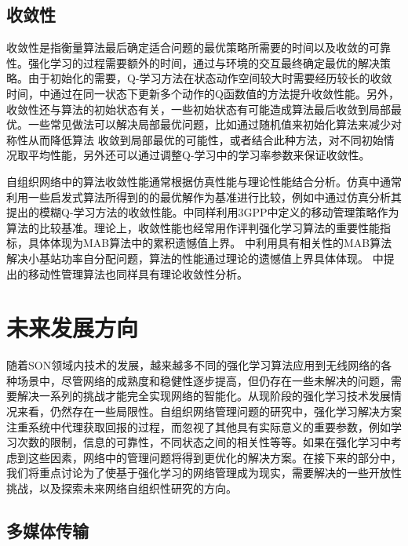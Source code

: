 \documentclass{IEEEtran}
\begin{document}
\subsection{收敛性}
收敛性是指衡量算法最后确定适合问题的最优策略所需要的时间以及收敛的可靠性。强化学习的过程需要额外的时间，通过与环境的交互最终确定最优的解决策略。由于初始化的需要，Q-学习方法在状态动作空间较大时需要经历较长的收敛时间，\cite{Simsek2011}中通过在同一状态下更新多个动作的Q函数值的方法提升收敛性能。另外，收敛性还与算法的初始状态有关，一些初始状态有可能造成算法最后收敛到局部最优。一些常见做法可以解决局部最优问题，比如通过随机值来初始化算法来减少对称性从而降低算法 收敛到局部最优的可能性，或者结合此种方法，对不同初始情况取平均性能，另外还可以通过调整Q-学习中的学习率参数来保证收敛性。

自组织网络中的算法收敛性能通常根据仿真性能与理论性能结合分析。仿真中通常利用一些启发式算法所得到的的最优解作为基准进行比较，例如\cite{Razavi2010a}中通过仿真分析其提出的模糊Q-学习方法的收敛性能。\cite{Simsek2015a}中同样利用3GPP中定义的移动管理策略作为算法的比较基准。理论上，收敛性能也经常用作评判强化学习算法的重要性能指标，具体体现为MAB算法中的累积遗憾值上界。\cite{Wang2017} 中利用具有相关性的MAB算法解决小基站功率自分配问题，算法的性能通过理论的遗憾值上界具体体现。\cite{Shen2016} 中提出的移动性管理算法也同样具有理论收敛性分析。

\section{未来发展方向}
\label{sec:FutureWork}


随着SON领域内技术的发展，越来越多不同的强化学习算法应用到无线网络的各种场景中，尽管网络的成熟度和稳健性逐步提高，但仍存在一些未解决的问题，需要解决一系列的挑战才能完全实现网络的智能化。从现阶段的强化学习技术发展情况来看，仍然存在一些局限性。自组织网络管理问题的研究中，强化学习解决方案注重系统中代理获取回报的过程，而忽视了其他具有实际意义的重要参数，例如学习次数的限制，信息的可靠性，不同状态之间的相关性等等。如果在强化学习中考虑到这些因素，网络中的管理问题将得到更优化的解决方案。在接下来的部分中，我们将重点讨论为了使基于强化学习的网络管理成为现实，需要解决的一些开放性挑战，以及探索未来网络自组织性研究的方向。

\subsection{多媒体传输}
\end{document}
